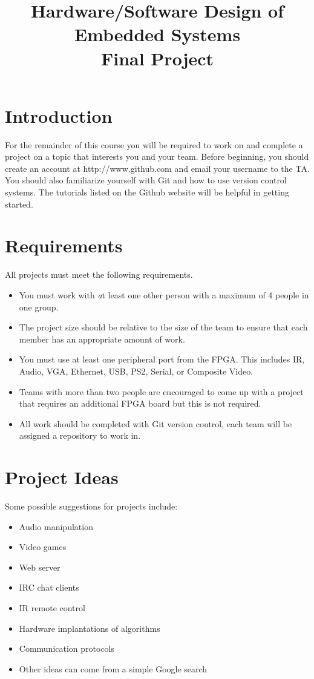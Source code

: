\documentclass[11pt]{article} %
\title{Hardware/Software Design of Embedded Systems \\Final Project}
\date{}
\begin{document}
\maketitle

\section{Introduction}

For the remainder of this course you will be required to work on and complete a project on a topic that interests you and your team. Before beginning, you should create an account at http://www.github.com and email your username to the TA. You should also familiarize yourself with Git and how to use version control systems. The tutorials listed on the Github website will be helpful in getting started.

\section{Requirements}
All projects must meet the following requirements.
\begin{itemize}
	\item You must work with {\emph at least} one other person with a maximum of 4 people in one group.
	\item The project size should be relative to the size of the team to ensure that each member has an appropriate amount of work.
	\item You must use at least one peripheral port from the FPGA. This includes IR, Audio, VGA, Ethernet, USB, PS2, Serial, or Composite Video. 
	\item Teams with more than two people are encouraged to come up with a project that requires an additional FPGA board but this is not required. 
	\item All work should be completed with Git version control, each team will be assigned a repository to work in. 
\end{itemize}

\section{Project Ideas}
Some possible suggestions for projects include:

\begin{itemize}
	\item Audio manipulation
	\item Video games
	\item Web server
	\item IRC chat clients
	\item IR remote control
	\item Hardware implantations of algorithms
	\item Communication protocols
	\item Other ideas can come from a simple Google search
\end{itemize}
\end{document}
